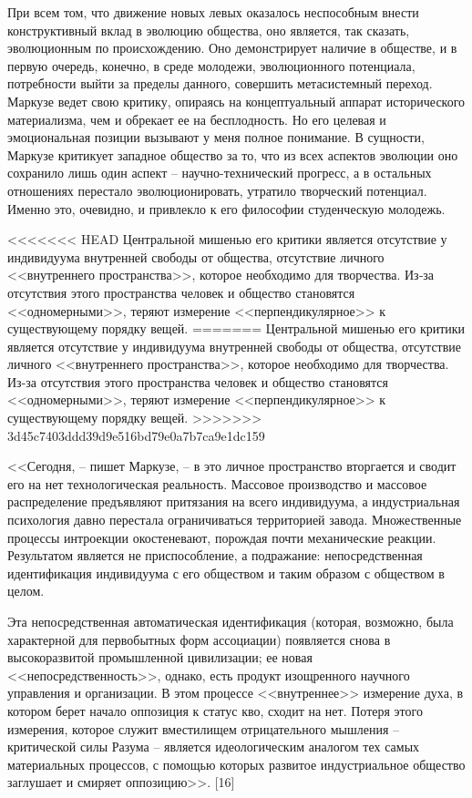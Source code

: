 \documentclass{book}
\begin{document}
{При всем том, что движение новых левых оказалось неспо­собным внести конструктивный вклад в эволюцию общества, оно является, так сказать, эволюционным по происхождению. Оно демонстрирует наличие в обществе, и в первую очередь, конечно, в среде молодежи, эволюционного потенциала, потребности выйти за пределы данного, совершить метасистемный переход. Маркузе ведет свою критику, опираясь на кон­цептуальный аппарат исторического материализма, чем и обре­кает ее на бесплодность. Но его целевая и эмоциональная пози­ции вызывают у меня полное понимание. В сущности, Маркузе критикует западное общество за то, что из всех аспектов эво­люции оно сохранило лишь один аспект -- научно-технический прогресс, а в остальных отношениях перестало эволюциони­ровать, утратило творческий потенциал. Именно это, очевид­но, и привлекло к его философии студенческую молодежь.

<<<<<<< HEAD
Центральной мишенью его критики является отсутствие у индивидуума внутренней свободы от общества, отсутствие лич­ного <<внутреннего пространства>>, которое необходимо для творчества. Из‑за отсутствия этого пространства человек и об­щество становятся <<одномерными>>, теряют измерение <<пер­пендикулярное>> к существующему порядку вещей.
=======
Центральной мишенью его критики является отсутствие у индивидуума внутренней свободы от общества, отсутствие лич­ного <<внутреннего пространства>>, которое необходимо для творчества. Из-за отсутствия этого пространства человек и об­щество становятся <<одномерными>>, теряют измерение <<пер­пендикулярное>> к существующему порядку вещей.
>>>>>>> 3d45c7403ddd39d9e516bd79e0a7b7ca9e1dc159

<<Сегодня, -- пишет Маркузе, -- в это личное пространство вторгается и сводит его на нет технологическая реальность. Массовое производство и массовое распределение предъявля­ют притязания на всего  индивидуума, а индустриальная психо­логия давно перестала ограничиваться территорией завода. Множественные процессы интроекции окостеневают, порож­дая почти механические реакции. Результатом является не при­способление, а подражание:  непосредственная идентификация индивидуума с его  обществом и таким образом с обществом в целом.

Эта непосредственная автоматическая идентификация (ко­торая, возможно, была характерной для первобытных форм ассоциации) появляется снова в высокоразвитой промышлен­ной цивилизации; ее новая <<непосредственность>>, однако, есть продукт изощренного научного управления и организа­ции. В этом процессе <<внутреннее>> измерение духа, в котором берет начало оппозиция к статус кво, сходит на нет. Потеря этого измерения, которое служит вместилищем отрицатель­ного мышления -- критической силы Разума -- является иде­ологическим аналогом тех самых материальных процессов, с помощью которых развитое индустриальное общество заглу­шает и смиряет оппозицию>>. [16]

}
\end{document}
